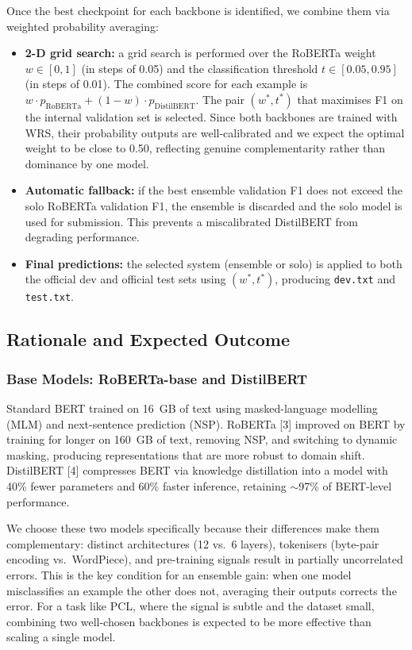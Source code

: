 \documentclass[11pt]{article}
\begin{document}
Once the best checkpoint for each backbone is identified, we combine them via weighted probability averaging:

\begin{itemize}[noitemsep]
    \item \textbf{2-D grid search:} a grid search is performed over the RoBERTa weight $w \in [0, 1]$ (in steps of 0.05) and the classification threshold $t \in [0.05, 0.95]$ (in steps of 0.01). The combined score for each example is $w \cdot p_{\text{RoBERTa}} + (1-w) \cdot p_{\text{DistilBERT}}$. The pair $(w^*, t^*)$ that maximises F1 on the internal validation set is selected. Since both backbones are trained with WRS, their probability outputs are well-calibrated and we expect the optimal weight to be close to 0.50, reflecting genuine complementarity rather than dominance by one model.
    \item \textbf{Automatic fallback:} if the best ensemble validation F1 does not exceed the solo RoBERTa validation F1, the ensemble is discarded and the solo model is used for submission. This prevents a miscalibrated DistilBERT from degrading performance.
    \item \textbf{Final predictions:} the selected system (ensemble or solo) is applied to both the official dev and official test sets using $(w^*, t^*)$, producing \texttt{dev.txt} and \texttt{test.txt}.
\end{itemize}

\subsection{Rationale and Expected Outcome}

\subsubsection*{Base Models: RoBERTa-base and DistilBERT}

Standard BERT trained on 16~GB of text using masked-language modelling (MLM) and next-sentence prediction (NSP). RoBERTa [3] improved on BERT by training for longer on 160~GB of text, removing NSP, and switching to dynamic masking, producing representations that are more robust to domain shift. DistilBERT [4] compresses BERT via knowledge distillation into a model with 40\% fewer parameters and 60\% faster inference, retaining $\sim$97\% of BERT-level performance.

We choose these two models specifically because their differences make them complementary: distinct architectures (12 vs.\ 6 layers), tokenisers (byte-pair encoding vs.\ WordPiece), and pre-training signals result in partially uncorrelated errors. This is the key condition for an ensemble gain: when one model misclassifies an example the other does not, averaging their outputs corrects the error. For a task like PCL, where the signal is subtle and the dataset small, combining two well-chosen backbones is expected to be more effective than scaling a single model.
\end{document}

